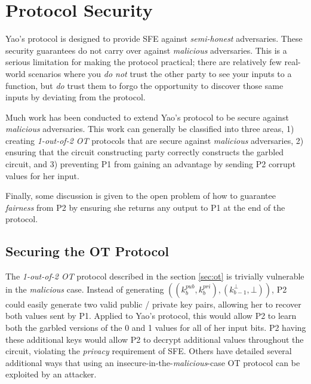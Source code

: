 \section{Protocol Security}
\label{sec:security}

Yao's protocol is designed to provide \ac{SFE} against \emph{semi-honest} adversaries. These security guarantees do not carry over against \emph{malicious} adversaries.  This is a serious limitation for making the protocol practical; there are relatively few real-world scenarios where you \emph{do not} trust the other party to see your inputs to a function, but \emph{do} trust them to forgo the opportunity to discover those same inputs by deviating from the protocol.

Much work has been conducted to extend Yao's protocol to be secure against \emph{malicious} adversaries.  This work can generally be classified into three areas, 1) creating \emph{1-out-of-2 \ac{OT}} protocols that are secure against \emph{malicious} adversaries, 2) ensuring that the circuit constructing party correctly constructs the garbled circuit, and 3) preventing \ac{P1} from gaining an advantage by sending \ac{P2} corrupt values for her input.

Finally, some discussion is given to the open problem of how to guarantee \emph{fairness} from \ac{P2} by ensuring she returns any output to \ac{P1} at the end of the protocol.

\subsection{Securing the \ac{OT} Protocol}
\label{sec:securingot}

The \emph{1-out-of-2 \ac{OT}} protocol described in the section \ref{sec:ot} is trivially vulnerable in the \emph{malicious} case.  Instead of generating $((k^{pub}_b, k^{pri}_b), (k^\bot_{b-1}, \bot))$, \ac{P2} could easily generate two valid public / private key pairs, allowing her to recover both values sent by \ac{P1}. Applied to Yao's protocol, this would allow \ac{P2} to learn both the garbled versions of the 0 and 1 values for all of her input bits. \ac{P2} having these additional keys would allow \ac{P2} to decrypt additional values throughout the circuit, violating the \emph{privacy} requirement of \ac{SFE}.  Others have detailed several additional ways that using an insecure-in-the-\emph{malicious}-case \ac{OT} protocol can be exploited by an attacker\cite{kiraz2006protocol}.

